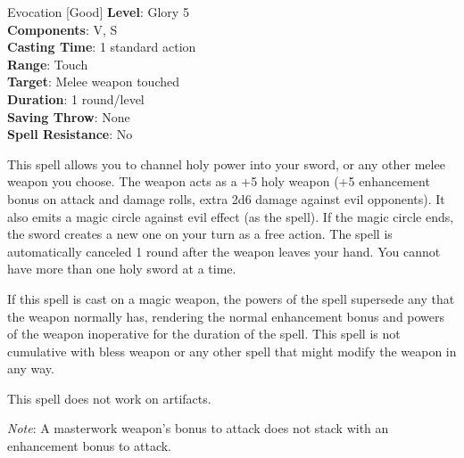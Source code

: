 {Evocation [Good]}
{
	\textbf{Level}: Glory 5\\
	\textbf{Components}: V, S\\
	\textbf{Casting Time}: 1 standard action\\
	\textbf{Range}: Touch\\
	\textbf{Target}: Melee weapon touched\\
	\textbf{Duration}: 1 round/level\\
	\textbf{Saving Throw}: None\\
	\textbf{Spell Resistance}: No\\
}
{
This spell allows you to channel holy power into your sword, or any other melee weapon you choose. The weapon acts as a +5 holy weapon (+5 enhancement bonus on attack and damage rolls, extra 2d6 damage against evil opponents). It also emits a magic circle against evil effect (as the spell). If the magic circle ends, the sword creates a new one on your turn as a free action. The spell is automatically canceled 1 round after the weapon leaves your hand. You cannot have more than one holy sword at a time.

If this spell is cast on a magic weapon, the powers of the spell supersede any that the weapon normally has, rendering the normal enhancement bonus and powers of the weapon inoperative for the duration of the spell. This spell is not cumulative with bless weapon or any other spell that might modify the weapon in any way.

This spell does not work on artifacts.

\textit{Note}: A masterwork weapon's bonus to attack does not stack with an enhancement bonus to attack.
}